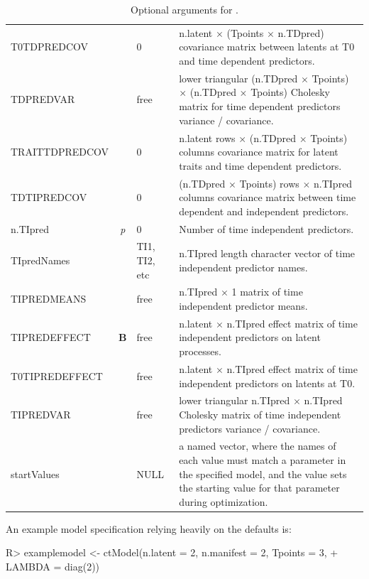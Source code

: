 \documentclass[nojss]{jss}\usepackage[]{graphicx}\usepackage[]{color}
\begin{document}
\begin{table}
\begin{tabular}{@{}l@{}|@{}c@{}|l@{}| p{8.6cm} }
T0TDPREDCOV & & 0 & n.latent $\times$ (Tpoints $\times$ n.TDpred) covariance matrix between latents at T0 and time dependent predictors.\\
TDPREDVAR & & free & lower triangular (n.TDpred $\times$ Tpoints) $\times$ (n.TDpred $\times$ Tpoints) Cholesky matrix for time dependent predictors variance / covariance.\\
TRAITTDPREDCOV & & 0 & n.latent rows $\times$ (n.TDpred $\times$ Tpoints) columns covariance matrix for latent traits and time dependent  predictors.\\
TDTIPREDCOV & & 0 & (n.TDpred $\times$ Tpoints) rows $\times$ n.TIpred columns covariance matrix between time dependent and independent predictors.\\
n.TIpred & \textit{p} & 0 & Number of time independent predictors.\\ 
TIpredNames & & TI1, TI2, etc & n.TIpred length character vector of time independent predictor names.\\
TIPREDMEANS & & free & n.TIpred $\times$ 1 matrix of time independent predictor means.\\
TIPREDEFFECT & $\textbf{B}$ & free & n.latent $\times$ n.TIpred effect matrix of time independent predictors on latent processes.\\
T0TIPREDEFFECT & & free & n.latent $\times$ n.TIpred effect matrix of time independent  predictors on latents at T0.\\
TIPREDVAR & & free & lower triangular n.TIpred $\times$ n.TIpred Cholesky matrix of time independent predictors variance / covariance.\\
startValues & & NULL & a named vector, where the names of each value must match a parameter in the specified model, and the value sets the starting value for that parameter during optimization.\\
\end{tabular}
\caption{\label{table:ctspecoptional}Optional arguments for .}
\end{table}
An example model specification relying heavily on the defaults is: 
\begin{Schunk}
\begin{Sinput}
R> examplemodel <- ctModel(n.latent = 2, n.manifest = 2, Tpoints = 3, 
+   LAMBDA = diag(2))
\end{Sinput}
\end{Schunk}
\end{document}

